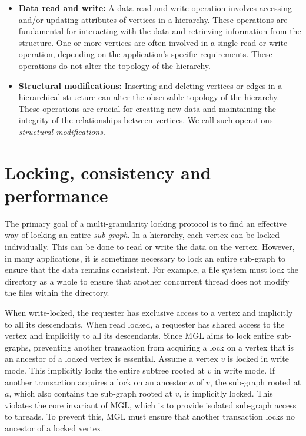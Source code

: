 \begin{itemize}

    
    \item \textbf{Data read and write:} A data read and write operation involves accessing and/or updating attributes of vertices in a hierarchy. These operations are fundamental for interacting with the data and retrieving information from the structure. One or more vertices are often involved in a single read or write operation, depending on the application's specific requirements. These operations do not alter the topology of the hierarchy.

    \item \textbf{Structural modifications:} Inserting and deleting vertices or edges in a hierarchical structure can alter the observable topology of the hierarchy. These operations are crucial for creating new data and maintaining the integrity of the relationships between vertices. We call such operations \emph{structural modifications}.
    

\end{itemize}

\section{Locking, consistency and performance}
The primary goal of a multi-granularity locking protocol is to find an effective way of locking an entire \emph{sub-graph}. In a hierarchy, each vertex can be locked individually. This can be done to read or write the data on the vertex. However, in many applications, it is sometimes necessary to lock an entire sub-graph to ensure that the data remains consistent. For example, a file system must lock the directory as a whole to ensure that another concurrent thread does not modify the files within the directory.


When write-locked, the requester has exclusive access to a vertex and implicitly to all its descendants. When read locked, a requester has shared access to the vertex and implicitly to all its descendants. Since MGL aims to lock entire sub-graphs, preventing another transaction from acquiring a lock on a vertex that is an ancestor of a locked vertex is essential. Assume a vertex $v$ is locked in write mode. This implicitly locks the entire subtree rooted at $v$ in write mode. If another transaction acquires a lock on an ancestor $a$ of $v$, the sub-graph rooted at $a$, which also contains the sub-graph rooted at $v$, is implicitly locked. This violates the core invariant of MGL, which is to provide isolated sub-graph access to threads. To prevent this, MGL must ensure that another transaction locks no ancestor of a locked vertex. 

